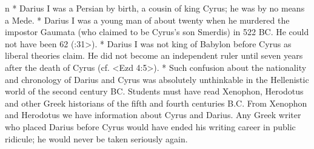 \begitems \style n
* Darius I was a Persian by birth, a cousin of king Cyrus; he was by no means a Mede.
* Darius I was a young man of about twenty when he murdered the impostor Gaumata (who claimed to be Cyrus's son Smerdis) in 522 BC.  He could not have been 62 (:31>). 
* Darius I was not king of Babylon before Cyrus as liberal theories claim. He did not become an independent ruler until seven years after the death of Cyrus (cf. <Ezd 4:5>).
* Such confusion about the nationality and chronology of Darius and Cyrus was absolutely unthinkable in the Hellenistic world of the second century BC.
Students must have read Xenophon, Herodotus and other Greek historians of the fifth and fourth centuries B.C. From Xenophon and Herodotus we have information about Cyrus and Darius.
Any Greek writer who placed Darius before Cyrus would have ended his writing career in public ridicule; he would never be taken seriously again.  
\enditems

